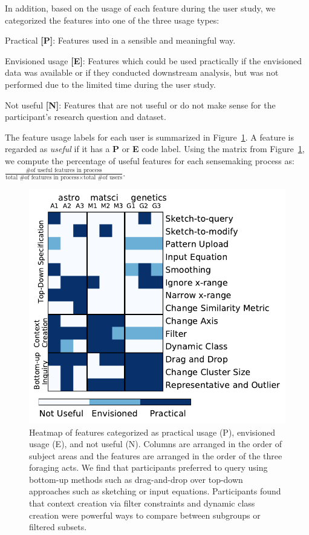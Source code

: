 \npar In addition, based on the usage of each feature during the user study, we categorized the features into one of the three usage types:
\begin{denselist}
    \item Practical \textbf{[P]}: Features used in a sensible and meaningful way.
    \item Envisioned usage \textbf{[E]}: Features which could be used practically if the envisioned data was available or if they conducted downstream analysis, but was not performed due to the limited time during the user study.
    \item Not useful \textbf{[N]}: Features that are not useful or do not make sense for the participant's research question and dataset.
\end{denselist}
The feature usage labels for each user is summarized in Figure~\ref{feature_heatmap}. A feature is regarded as \emph{useful} if it has a \textbf{P} or \textbf{E} code label. Using the matrix from Figure~\ref{feature_heatmap}, we compute the percentage of useful features for each sensemaking process as: $\frac{\textrm{\# of useful features in process}}{\textrm{total \# of features in process} \times \textrm{total \# of users}}$.
\begin{figure}[h!]
    \centering
    \includegraphics[width=0.75\columnwidth]{figures/PENcoding.pdf}
    \vspace{-6pt}\caption{Heatmap of features categorized as practical usage (P), envisioned usage (E), and not useful (N). Columns are arranged in the order of subject areas and the features are arranged in the order of the three foraging acts. We find that participants preferred to query using bottom-up methods such as drag-and-drop over top-down approaches such as sketching or input equations. Participants found that context creation via filter constraints and dynamic class creation were powerful ways to compare between subgroups or filtered subsets.}
    \label{feature_heatmap}
    \vspace{-5pt}
\end{figure}
